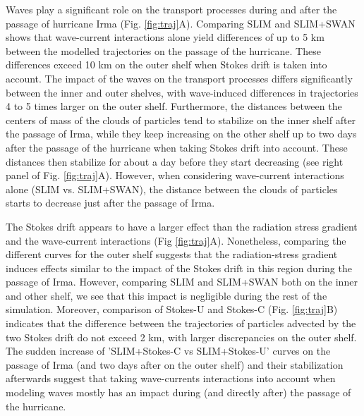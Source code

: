 \documentclass[preprint,12pt,authoryear]{elsarticle}
\begin{document}
Waves play a significant role on the transport processes during and after the passage of hurricane Irma (Fig. \ref{fig:traj}A). Comparing SLIM and SLIM+SWAN shows that wave-current interactions alone yield differences of up to 5 km between the modelled trajectories on the passage of the hurricane. These differences exceed 10 km on the outer shelf when Stokes drift is taken into account. The impact of the waves on the transport processes differs significantly between the inner and outer shelves, with wave-induced differences in trajectories 4 to 5 times larger on the outer shelf. Furthermore, the distances between the centers of mass of the clouds of particles tend to stabilize on the inner shelf after the passage of Irma, while they keep increasing on the other shelf up to two days after the passage of the hurricane when taking Stokes drift into account. These distances then stabilize for about a day before they start decreasing (see right panel of Fig. \ref{fig:traj}A). However, when considering wave-current interactions alone (SLIM vs. SLIM+SWAN), the distance between the clouds of particles starts to decrease just after the passage of Irma. 

The Stokes drift appears to have a larger effect than the radiation stress gradient and the wave-current interactions (Fig \ref{fig:traj}A). Nonetheless, comparing the different curves for the outer shelf suggests that the radiation-stress gradient induces effects similar to the impact of the Stokes drift in this region during the passage of Irma. However, comparing SLIM and SLIM+SWAN both on the inner and other shelf, we see that this impact is negligible during the rest of the simulation. Moreover, comparison of Stokes-U and Stokes-C (Fig. \ref{fig:traj}B) indicates that the difference between the trajectories of particles advected by the two Stokes drift do not exceed 2 km, with larger discrepancies on the outer shelf. The sudden increase of 'SLIM+Stokes-C vs SLIM+Stokes-U' curves on the passage of Irma (and two days after on the outer shelf) and their stabilization afterwards suggest that taking wave-currents interactions into account when modeling waves mostly has an impact during (and directly after) the passage of the hurricane.
\end{document}

